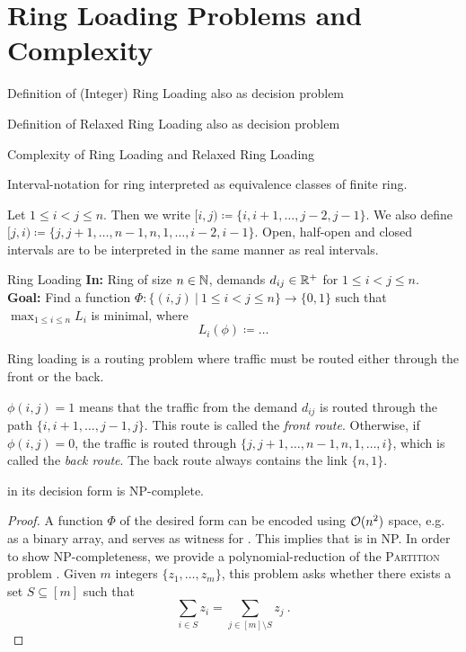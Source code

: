 \section{Ring Loading Problems and Complexity}

Definition of (Integer) Ring Loading also as decision problem

Definition of Relaxed Ring Loading also as decision problem

Complexity of Ring Loading and Relaxed Ring Loading

Interval-notation for ring interpreted as equivalence classes of finite ring.

\begin{notation}
	Let $1 \leq i < j \leq n$.
	Then we write $[i, j) \coloneqq \{i, i+1, \ldots, j-2, j-1\}$.
	We also define $[j, i) \coloneqq \{j, j+1, \ldots, n-1, n, 1, \ldots, i-2, i-1\}$.
	Open, half-open and closed intervals are to be interpreted in the same manner as real intervals.
\end{notation}

\begin{problem}{Ring Loading}
	\textbf{In:} Ring of size $n \in \mathbb{N}$, demands $d_{ij} \in \mathbb{R}^+$ for $1 \leq i < j \leq n$.\\
	\textbf{Goal:} Find a function $\Phi: \{(i, j)~|~1 \leq i < j \leq n\} \rightarrow \{0, 1\}$ such that
	$\max_{1 \leq i \leq n} L_i$ is minimal, where
	\begin{equation}
		L_i(\phi) \coloneqq \ldots
	\end{equation}
\end{problem}
Ring loading is a routing problem where traffic must be routed either through the front or the back.

$\phi(i, j) = 1$ means that the traffic from the demand $d_{ij}$ is routed through the path $\{i, i+1, \ldots, j-1, j\}$.
This route is called the \emph{front route}.
Otherwise, if $\phi(i, j) = 0$, the traffic is routed through $\{j, j+1, \ldots, n-1, n, 1, \ldots, i\}$, which is called the \emph{back route}.
The back route always contains the link $\{n, 1\}$.

\begin{theorem}
	\RL in its decision form is NP-complete.
\end{theorem}
\begin{proof}
	A function $\Phi$ of the desired form can be encoded using $\mathcal{O}(n^2)$ space, e.g. as a binary array, and serves as witness for \RL.
	This implies that \RL is in NP.
	In order to show NP-completeness, we provide a polynomial-reduction of the \textsc{Partition} problem \cite{karp72}.
	Given $m$ integers $\{z_1, \ldots, z_m\}$, this problem asks whether there exists a set $S \subseteq [m]$ such that 
	\begin{equation}
		\sum_{i \in S} z_i = \sum_{j \in [m] \setminus S} z_j \ .
	\end{equation}
	
\end{proof}

